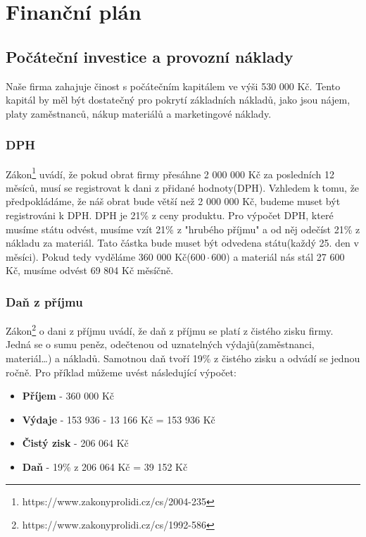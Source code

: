 \documentclass[12pt, a4paper]{article}
\begin{document}
\section{Finanční plán}

\subsection{Počáteční investice a provozní náklady}

Naše firma zahajuje činost s počátečním kapitálem ve výši 530 000 Kč.
Tento kapitál by měl být dostatečný pro pokrytí základních nákladů,
jako jsou nájem, platy zaměstnanců, nákup materiálů a marketingové náklady.

\pagebreak

\subsubsection{DPH}

Zákon\footnote{https://www.zakonyprolidi.cz/cs/2004-235} uvádí,
že pokud obrat firmy přesáhne 2 000 000 Kč za posledních 12 měsíců,
musí se registrovat k dani z přidané hodnoty(DPH). Vzhledem k tomu, že
předpokládáme, že náš obrat bude větší než 2 000 000 Kč, budeme muset
být registrováni k DPH. DPH je 21\% z ceny produktu.
Pro výpočet DPH, které musíme státu odvést, musíme vzít 21\% z "hrubého příjmu"
a od něj odečíst 21\% z nákladu za materiál.
Tato částka bude muset být odvedena státu(každý 25. den v měsíci).
Pokud tedy vyděláme 360 000 Kč($600\cdot 600$) a materiál nás stál 27 600 Kč,
musíme odvést 69 804 Kč měsíčně.

\subsubsection{Daň z příjmu}

Zákon\footnote{https://www.zakonyprolidi.cz/cs/1992-586} o dani z příjmu uvádí, že
daň z příjmu se platí z čistého zisku firmy. Jedná se o sumu peněz, odečtenou
od uznatelných výdajů(zaměstnanci, materiál\dots) a nákladů. Samotnou daň
tvoří 19\% z čistého zisku a odvádí se jednou ročně. Pro příklad
můžeme uvést následující výpočet:
\begin{itemize}
  \item \textbf{Příjem} - 360 000 Kč
  \item \textbf{Výdaje} - 153 936 - 13 166 Kč = 153 936 Kč
  \item \textbf{Čistý zisk} - 206 064 Kč
  \item \textbf{Daň} - 19\% z 206 064 Kč = 39 152 Kč
\end{itemize}
\end{document}
